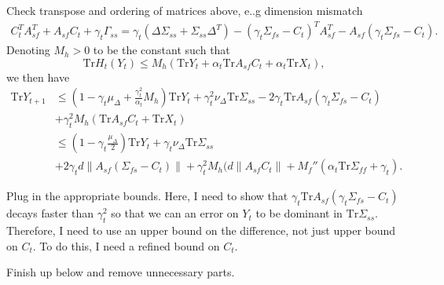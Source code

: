 {\color{red}Check transpose and ordering of matrices above, e..g dimension mismatch}
\begin{align*}
    C_t^T A_{sf}^T + A_{sf} C_t + \gamma_t \Gamma_{ss}
    = 
    \gamma_t \left(\Delta \Sigma_{ss} + \Sigma_{ss} \Delta^T\right) - (\gamma_t\Sigma_{fs} - C_t)^T A_{sf}^T - A_{sf} (\gamma_t \Sigma_{fs} - C_t) .
\end{align*}
Denoting $M_h > 0$ to be the constant such that
\begin{equation}
    \mathrm{Tr} H_t (Y_t) \leq M_h \left(\mathrm{Tr} Y_t + \alpha_t \mathrm{Tr} A_{sf} C_t  + \alpha_t \mathrm{Tr} X_t \right) ,
\end{equation}
we then have 
\begin{align*}
    \mathrm{Tr} Y_{t+1} 
    &\leq 
    \left(1 - \gamma_t \mu_\Delta + \frac{\gamma_t^2}{\alpha_t} M_h\right) \mathrm{Tr} Y_t 
    + \gamma_t^2 \nu_\Delta \mathrm{Tr} \Sigma_{ss}
    - 2 \gamma_t \mathrm{Tr} A_{sf} (\gamma_t \Sigma_{fs} - C_t)
    \\ &
    + \gamma_t^2 M_h \left( \mathrm{Tr} A_{sf} C_t + \mathrm{Tr} X_t\right) 
    \\ 
    & 
    \leq \left(1 - \gamma_t \frac{\mu_\Delta}{2}\right) \mathrm{Tr} Y_t 
    + \gamma_t \nu_\Delta \mathrm{Tr} \Sigma_{ss}
    \\
    &+ 2\gamma_t d \lVert A_{sf} (\Sigma_{fs} - C_t)\rVert 
    +\gamma_t^2 M_h (d \lVert A_{sf} C_t \rVert + M_{f}''(\alpha_t \mathrm{Tr} \Sigma_{ff} + \gamma_t)
    .
\end{align*}
{\color{red}Plug in the appropriate bounds.
Here, I need to show that $\gamma_t \mathrm{Tr} A_{sf} (\gamma_t \Sigma_{fs} - C_t)$ decays faster than $\gamma_t^2$ so that we can an error on $Y_t$ to be dominant in $\mathrm{Tr} \Sigma_{ss}$.
Therefore, I need to use an upper bound on the difference, not just upper bound on $C_t$.
To do this, I need a refined bound on $C_t$.

Finish up below and remove unnecessary parts. 
}

